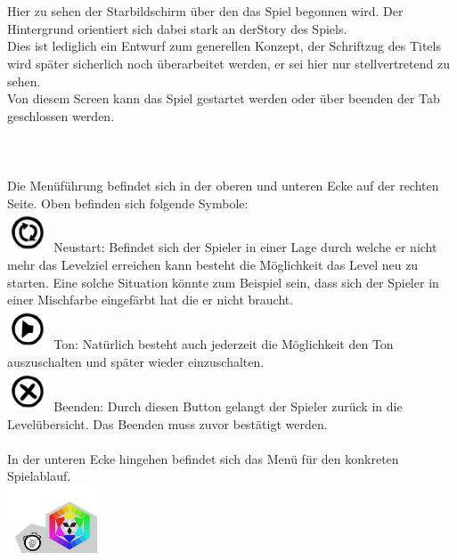 \documentclass[10pt,a4paper,notitlepage]{report}
\begin{document}
	\\\\
	\Text
	Hier zu sehen der Starbildschirm über den das Spiel begonnen wird. Der Hintergrund orientiert sich dabei stark an derStory des Spiels.\\
	Dies ist lediglich ein Entwurf zum generellen Konzept, der Schriftzug des Titels wird später sicherlich noch überarbeitet werden, er sei hier nur stellvertretend zu 		sehen.\\
	Von diesem Screen kann das Spiel gestartet werden oder über beenden der Tab geschlossen werden.\\
	\clearpage\
	\\
	\\
	\\
	\Text
		Die Menüführung befindet sich in der oberen und unteren Ecke auf der rechten Seite. Oben befinden sich folgende Symbole:
	\\
	\includegraphics[width=0.09\textwidth]{png/renew.png}\ 
	 Neustart: Befindet sich der Spieler in einer Lage durch welche er nicht mehr das Levelziel erreichen 			kann besteht die Möglichkeit das Level neu zu 			starten. Eine solche Situation könnte zum Beispiel sein, dass sich der Spieler in einer Mischfarbe eingefärbt hat die er 		nicht braucht.\
	\\
	\includegraphics[width=0.09\textwidth]{png/sound.png}\ 
	 Ton: Natürlich besteht auch jederzeit die Möglichkeit den Ton auszuschalten und später wieder einzuschalten.\
	\\
	\includegraphics[width=0.09\textwidth]{png/quit.png}\ 
	 Beenden: Durch diesen Button gelangt der Spieler zurück in die Levelübersicht. Das Beenden muss zuvor bestätigt werden. \
	\\\\
	In der unteren Ecke hingehen befindet sich das Menü für den konkreten Spielablauf.
	\\
	\includegraphics[width=0.2\textwidth]{png/menu.png}\ 
\end{document}

